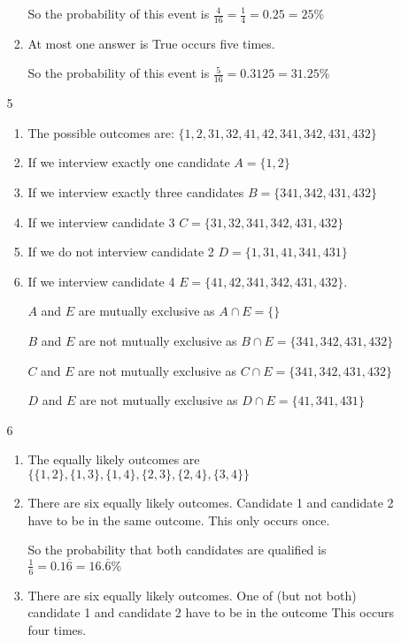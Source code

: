 \documentclass[12pt,letterpaper]{article}
\begin{document}
\begin{enumerate}
\begin{enumerate}
\begin{enumerate}[label=(\arabic*)]
              So the probability of this event is $\frac{4}{16} = \frac{1}{4} = 0.25 = 25\%$
            \item
              At most one answer is True occurs five times.

              So the probability of this event is $\frac{5}{16} = 0.3125 = 31.25\%$
          \end{enumerate}
        \item [5]
          \begin{enumerate}[label=(\arabic*)]
            \item
              The possible outcomes are:
              $\{1, 2, 31, 32, 41, 42, 341, 342, 431, 432\}$
            \item
              If we interview exactly one candidate $A = \{1, 2\}$
            \item
              If we interview exactly three candidates $B = \{341, 342, 431, 432\}$
            \item
              If we interview candidate 3 $C = \{31, 32, 341, 342, 431, 432\}$
            \item
              If we do not interview candidate 2 $D = \{1, 31, 41, 341, 431\}$
            \item
              If we interview candidate 4 $E = \{41, 42, 341, 342, 431, 432\}$.

              $A$ and $E$ are mutually exclusive as $A \cap E = \{\}$

              $B$ and $E$ are not mutually exclusive as $B \cap E = \{341, 342, 431, 432\}$

              $C$ and $E$ are not mutually exclusive as $C \cap E = \{341, 342, 431, 432\}$

              $D$ and $E$ are not mutually exclusive as $D \cap E = \{41, 341, 431\}$
          \end{enumerate}
        \item [6]
          \begin{enumerate}[label=(\arabic*)]
            \item
              The equally likely outcomes are $\{\{1, 2\}, \{1, 3\}, \{1, 4\}, \{2, 3\}, \{2, 4\}, \{3, 4\}\}$
            \item
              There are six equally likely outcomes.
              Candidate 1 and candidate 2 have to be in the same outcome.
              This only occurs once.

              So the probability that both candidates are qualified is
              $\frac{1}{6} = 0.1\overline{6} = 16.\overline{6}\%$
            \item
              There are six equally likely outcomes.
              One of (but not both) candidate 1 and candidate 2 have to be in the outcome
              This occurs four times.


\end{enumerate}
\end{enumerate}
\end{enumerate}
\end{document}

